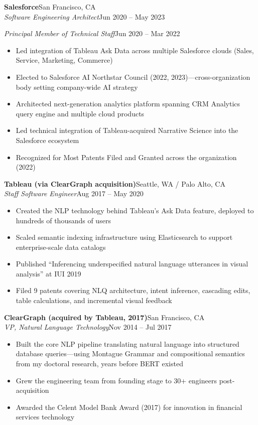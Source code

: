 \documentclass[9pt,letterpaper]{extarticle}
\newcommand{\entry}[4]{%
  \noindent\textbf{\color{dark}#1}\hfill\textcolor{ltgray}{\small #2}\\[-0.1em]
  \textit{\color{medgray}#3}\hfill\textcolor{ltgray}{\small #4}\par
}
\newcommand{\subentry}[2]{%
  \noindent\hspace{0.4em}\textit{\color{medgray}#1}\hfill\textcolor{ltgray}{\small #2}\par
}
\begin{document}
\vspace{0.1em}

\entry{Salesforce}{San Francisco, CA}
      {Software Engineering Architect}{Jun 2020 -- May 2023}
\subentry{Principal Member of Technical Staff}{Jun 2020 -- Mar 2022}
\begin{itemize}
  \item Led integration of Tableau Ask Data across multiple Salesforce clouds (Sales, Service, Marketing, Commerce)
  \item Elected to Salesforce AI Northstar Council (2022, 2023)---cross-organization body setting company-wide AI strategy
  \item Architected next-generation analytics platform spanning CRM Analytics query engine and multiple cloud products
  \item Led technical integration of Tableau-acquired Narrative Science into the Salesforce ecosystem
  \item Recognized for Most Patents Filed and Granted across the organization (2022)
\end{itemize}

\vspace{0.1em}

\entry{Tableau \textnormal{\textcolor{ltgray}{\small(via ClearGraph acquisition)}}}{Seattle, WA / Palo Alto, CA}
      {Staff Software Engineer}{Aug 2017 -- May 2020}
\begin{itemize}
  \item Created the NLP technology behind Tableau's Ask Data feature, deployed to hundreds of thousands of users
  \item Scaled semantic indexing infrastructure using Elasticsearch to support enterprise-scale data catalogs
  \item Published ``Inferencing underspecified natural language utterances in visual analysis'' at IUI 2019
  \item Filed 9 patents covering NLQ architecture, intent inference, cascading edits, table calculations, and incremental visual feedback
\end{itemize}

\vspace{0.1em}

\entry{ClearGraph \textnormal{\textcolor{ltgray}{\small(acquired by Tableau, 2017)}}}{San Francisco, CA}
      {VP, Natural Language Technology}{Nov 2014 -- Jul 2017}
\begin{itemize}
  \item Built the core NLP pipeline translating natural language into structured database queries---using Montague Grammar and compositional semantics from my doctoral research, years before BERT existed
  \item Grew the engineering team from founding stage to 30+ engineers post-acquisition
  \item Awarded the Celent Model Bank Award (2017) for innovation in financial services technology
\end{itemize}
\end{document}
